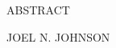{}

\begin{center}
    \large
    ABSTRACT

    \large
    \dissertationTitle{}

    \large
    \vspace{2mm}
    JOEL N. JOHNSON

\end{center}

\noindent

